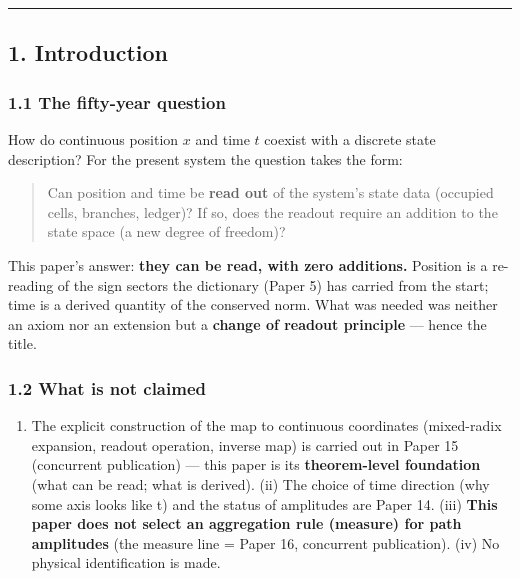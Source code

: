 \documentclass[
]{article}
\providecommand{\tightlist}{%
  \setlength{\itemsep}{0pt}\setlength{\parskip}{0pt}}
\begin{document}
\begin{center}\rule{0.5\linewidth}{0.5pt}\end{center}

\subsection{1. Introduction}\label{introduction}

\subsubsection{1.1 The fifty-year
question}\label{the-fifty-year-question}

How do continuous position \(x\) and time \(t\) coexist with a discrete
state description? For the present system the question takes the form:

\begin{quote}
Can position and time be \textbf{read out} of the system's state data
(occupied cells, branches, ledger)? If so, does the readout require an
addition to the state space (a new degree of freedom)?
\end{quote}

This paper's answer: \textbf{they can be read, with zero additions.}
Position is a re-reading of the sign sectors the dictionary (Paper 5)
has carried from the start; time is a derived quantity of the conserved
norm. What was needed was neither an axiom nor an extension but a
\textbf{change of readout principle} --- hence the title.

\subsubsection{1.2 What is not claimed}\label{what-is-not-claimed}

\begin{enumerate}
\def\labelenumi{(\roman{enumi})}
\tightlist
\item
  The explicit construction of the map to continuous coordinates
  (mixed-radix expansion, readout operation, inverse map) is carried out
  in Paper 15 (concurrent publication) --- this paper is its
  \textbf{theorem-level foundation} (what can be read; what is derived).
  (ii) The choice of time direction (why some axis looks like t) and the
  status of amplitudes are Paper 14. (iii) \textbf{This paper does not
  select an aggregation rule (measure) for path amplitudes} (the measure
  line = Paper 16, concurrent publication). (iv) No physical
  identification is made.
\end{enumerate}
\end{document}

